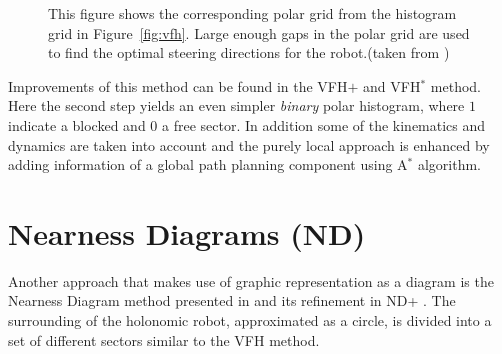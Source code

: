 \begin{figure}[thpb]
	  \myfloatalign
      \footnotesize
      \centering
   \caption[Vector Field Polar Histogram.]{This figure shows the corresponding polar grid from the histogram grid in Figure~\ref{fig:vfh}. Large enough gaps in the polar grid are used to find the optimal steering directions for the robot.(taken from \cite{borenstein1991vector})}
   \label{fig:polar}
\end{figure}

Improvements of this method can be found in the VFH$+$ \cite{ulrich1998vfh+} and VFH$^*$ \cite{ulrich2000vfh} method. 
Here the second step yields an even simpler \emph{binary} polar histogram, where $1$ indicate a blocked and $0$ a free sector. 
In addition some of the kinematics and dynamics are taken into account and the purely local approach is enhanced by adding information of a global path planning component using A$^*$ algorithm. 

\section{Nearness Diagrams (ND)}
Another approach that makes use of graphic representation as a diagram is the Nearness Diagram method presented in \cite{minguez2004nearness} and its refinement in ND+ \cite{minguez2004divide}.
The surrounding of the holonomic robot, approximated as a circle, is divided into a set of different sectors similar to the VFH method.

